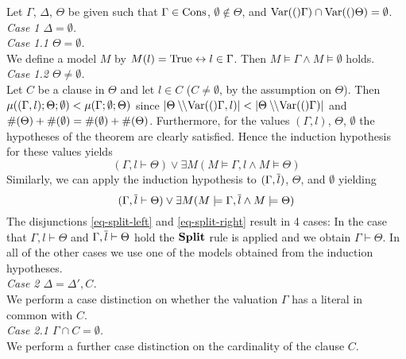 \begin{mytheorem}
{\bigskip

Let $\Gamma$, $\Delta$, $\Theta$ be given such that
$\Gamma\in\mathrm{Cons}$, $\emptyset \notin \Theta$, and 
$\mathrm{Var}(()\Gamma) \cap \mathrm{Var}(()\Theta) = \emptyset$. \\[1em]
%
\noindent\emph{Case 1 $\Delta = \emptyset$.} \\[1em]
%
\noindent\emph{Case 1.1 $\Theta = \emptyset$.}\\ %
%
We define a model $M$ by 
$M(l) = \mathrm{True} \leftrightarrow l \in \Gamma$. Then 
$M \models \Gamma \land M \models \emptyset$ holds.\\[1em]
%
\noindent\emph{Case 1.2 $\Theta \neq \emptyset$.}\\  
%
Let $C$ be a clause in $\Theta$ and let $l\in C$ ($C\neq\emptyset$, by the 
assumption on $\Theta$). Then 
%
$\mu((\Gamma,l);\Theta;\emptyset) < \mu(\Gamma;\emptyset;\Theta)$
%
since $|\Theta \setminus\!\!\setminus \mathrm{Var}(()\Gamma,l)| < |\Theta \setminus\!\!\setminus \mathrm{Var}(()\Gamma)|$ and $\#(\Theta) + \#(\emptyset) = \#(\emptyset) + \#(\Theta)$. 
Furthermore, for the values $(\Gamma,l)$, $\Theta$, $\emptyset$
the hypotheses of the theorem are clearly satisfied.  
Hence the induction hypothesis for these values yields
%
\begin{equation}\label{eq-split-left}
(\Gamma,l \vdash  \Theta) \lor 
 \exists M(M \models \Gamma,l \wedge M \models \Theta)
\end{equation}
%
Similarly, we can apply the induction hypothesis to 
$(\Gamma,\overline{l})$, $\Theta$, and $\emptyset$ yielding
%
\begin{equation}\label{eq-split-right}
(\Gamma,\overline{l} \vdash  \Theta) \lor 
 \exists M(M \models \Gamma,\overline{l} \wedge M \models \Theta)
\end{equation}
%
The disjunctions \eqref{eq-split-left} and \eqref{eq-split-right} result
in 4 cases:
%
In the case that $\Gamma,l \vdash \Theta$ and $\Gamma, \overline{l} \vdash \Theta$ hold 
the $\mathbf{Split}$ rule is applied and we obtain $\Gamma \vdash \Theta$. 
%
In all of the other cases we use one of the models obtained from the 
induction hypotheses. \\[1em]
%
\noindent\emph{Case 2 $\Delta = \Delta', C$.}\\
%
We perform a case distinction on whether the valuation $\Gamma$ has a 
literal  in common with $C$.\\[1em]
%
\noindent\emph{Case 2.1  $ \Gamma \cap C = \emptyset$.}\\
%
We perform a further case distinction on the cardinality of the clause $C$.\\[1em]
}
\end{mytheorem}
